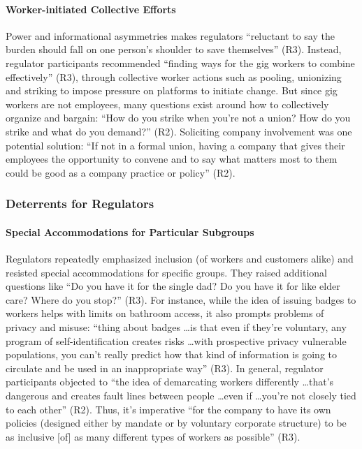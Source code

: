 \paragraph{Worker-initiated Collective Efforts} \label{worker_action}
Power and informational asymmetries makes regulators ``reluctant to say the burden should fall on one person's shoulder to save themselves'' (R3). Instead, regulator participants recommended ``finding ways for the gig workers to combine effectively'' (R3), through collective worker actions such as pooling, unionizing and striking to impose pressure on platforms to initiate change. 
But since gig workers are not employees, many questions exist around how to collectively organize and bargain: ``How do you strike when you're not a union? How do you strike and what do you demand?'' (R2). 
Soliciting company involvement was one potential solution: ``If not in a formal union, having a company that gives their employees the opportunity to convene and to say what matters most to them could be good as a company practice or policy'' (R2).

\subsubsection{Deterrents for Regulators}
\paragraph{Special Accommodations for Particular Subgroups}
Regulators repeatedly emphasized inclusion (of workers and customers alike) and resisted special accommodations for specific groups. They raised additional questions like ``Do you have it for the single dad? Do you have it for like elder care? Where do you stop?'' (R3). 
For instance, while the idea of issuing badges to workers helps with limits on bathroom access, it also prompts problems of privacy and misuse: ``thing about badges \dots is that even if they're voluntary, any program of self-identification creates risks \dots with prospective privacy vulnerable populations, you can't really predict how that kind of information is going to circulate and be used in an inappropriate way'' (R3). 
In general, regulator participants objected to ``the idea of demarcating workers differently \dots that's dangerous and creates fault lines between people \dots even if \dots you're not closely tied to each other'' (R2). Thus, it's imperative ``for the company to have its own policies (designed either by mandate or by voluntary corporate structure) to be as inclusive [of] as many different types of workers as possible'' (R3). 

